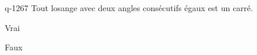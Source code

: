 \begin{truefalse}{q-1267}
Tout losange avec deux angles consécutifs égaux est un carré.
\item* Vrai
\item Faux
\end{truefalse}

